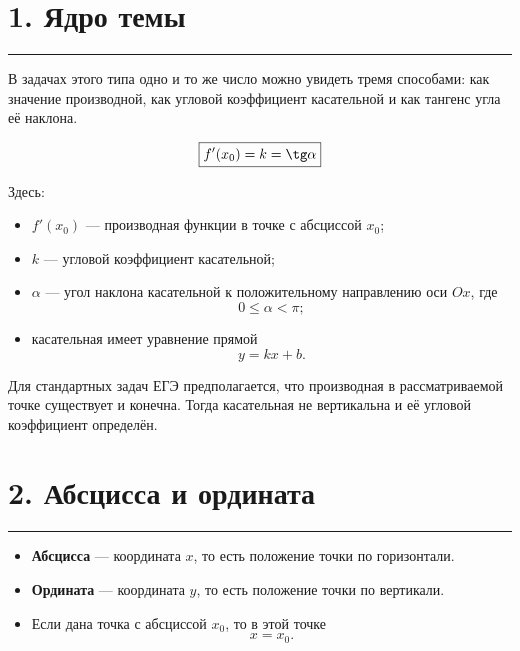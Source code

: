 \documentclass[a4paper,12pt]{article}
\newcommand{\checkbox}{\(\square\)}
\newcommand{\topicrule}{%
  \par\noindent
  {\color{accent}\rule{\linewidth}{0.55pt}}
  \par
}
\newcommand{\keyformula}[1]{%
  \begin{center}
    {\color{darkaccent}\large #1}
  \end{center}
}
\begin{document}
\setcounter{page}{1}


\section*{\color{darkaccent}1. Ядро темы}
\topicrule

В задачах этого типа одно и то же число можно увидеть тремя способами:
как значение производной, как угловой коэффициент касательной и как
тангенс угла её наклона.

\keyformula{
\[
\boxed{f'(x_0)=k=\tg\alpha}
\]
}

Здесь:

\begin{itemize}
  \item[\checkbox]
  \(f'(x_0)\) --- производная функции в точке с абсциссой \(x_0\);

  \item[\checkbox]
  \(k\) --- угловой коэффициент касательной;

  \item[\checkbox]
  \(\alpha\) --- угол наклона касательной к положительному направлению
  оси \(Ox\), где
  \[
  0\le\alpha<\pi;
  \]

  \item[\checkbox]
  касательная имеет уравнение прямой
  \[
  y=kx+b.
  \]
\end{itemize}

Для стандартных задач ЕГЭ предполагается, что производная в рассматриваемой
точке существует и конечна. Тогда касательная не вертикальна и её угловой
коэффициент определён.

\section*{\color{darkaccent}2. Абсцисса и ордината}
\topicrule

\begin{itemize}
  \item[\checkbox]
  \textbf{Абсцисса} --- координата \(x\), то есть положение точки
  по горизонтали.

  \item[\checkbox]
  \textbf{Ордината} --- координата \(y\), то есть положение точки
  по вертикали.

  \item[\checkbox]
  Если дана точка с абсциссой \(x_0\), то в этой точке
  \[
  x=x_0.
  \]
\end{itemize}
\end{document}
